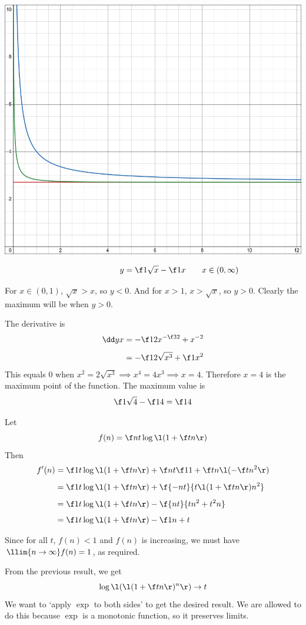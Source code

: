 \documentclass[a4paper]{article}
\begin{document}
\begin{center}
	\includegraphics[scale=0.3]{Q1-graph.png}
\end{center}



$$\phantom{\qquad x \in (0, \infty)} y = \f1{\sqrt x} - \f1x \qquad x \in (0, \infty)$$

For $x \in (0,1)$, $\sqrt x > x$, so $y < 0$. And for $x > 1$, $x > \sqrt x$, so $y > 0$. Clearly the maximum will be when $y > 0$.

The derivative is \begin{align*}
\dd yx &= -\f12 x^{-\f32} + x^{-2}\\[1ex]
&= - \f1{2\sqrt{x^3}} + \f1{x^2}
\end{align*}
This equals 0 when $x^2 = 2 \sqrt{x^3} \implies x^4 = 4x^3 \implies x = 4$. Therefore $x = 4$ is the maximum point of the function. The maximum value is $$\f1{\sqrt 4} - \f14 = \f14$$



Let $$f(n) = \f nt \log\l( 1 + \f tn \r)$$
Then \begin{align*}
f'(n) &= \f1t \log\l( 1 + \f tn \r) + \f nt \f1{1 + \f tn} \l(-\f t{n^2}\r)\\[1ex]
&= \f1t \log\l( 1 + \f tn \r) + \f{-nt}{t \l( 1 + \f tn \r) n^2}\\[1ex]
&= \f1t \log\l( 1 + \f tn \r) - \f{nt}{tn^2 + t^2n}\\[1ex]
&= \f1t \log\l( 1 + \f tn \r) - \f1{n + t}
\end{align*}


Since for all $t$, $f(n) < 1$ and $f(n)$ is increasing, we must have $\llim{n \to \infty} f(n) = 1$, as required.

From the previous result, we get $$\log\l( \l( 1 + \f tn \r)^n \r) \to t$$
We want to \enquote*{apply $\exp$ to both sides} to get the desired result. We are allowed to do this because $\exp$ is a monotonic function, so it preserves limits.

\end{document}
